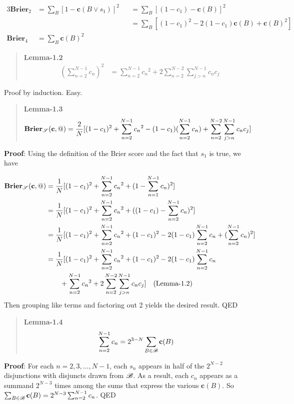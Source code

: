 \begin{alignat*}{3}
\mathbf{Brier}_2 &= \sum_B[1 - \mathbf{c}(B \vee s_1)]^2 &&= \sum_B[(1 - c_1) - \mathbf{c}(B)]^2 \\
& &&= \sum_B [(1-c_1)^2 - 2(1-c_1)\mathbf{c}(B) + \mathbf{c}(B)^2] \\
\mathbf{Brier}_4 &= \sum_B \mathbf{c}(B)^2 && \quad
\end{alignat*}

\begin{quote}
\textbf{Lemma-1.2} 
\begin{align*}
(\sum_{n=2}^{N-1} c_n)^2 &= \sum_{n=2}^{N-1} c{_n}^2 + 2 \sum_{n=2}^{N-2} \sum_{j>n}^{N-1}c_nc_j
\end{align*}
\end{quote}
Proof by induction. Easy. 

\begin{quote}
\textbf{Lemma-1.3}
\begin{align*}
\mathbf{Brier}_{\mathscr{S}}(\mathbf{c},@) &= \frac{2}{N}[(1-c_1)^2 + \sum_{n=2}^{N-1} c{_n}^2  - (1-c_1)(\sum_{n=2}^{N-1}c_n) + \sum_{n=2}^{N-2} \sum_{j>n}^{N-1}c_nc_j]
\end{align*}
\end{quote}
\textbf{Proof}: Using the definition of the Brier score and the fact that $s_1$ is true, we have
 
\begin{align*}
\mathbf{Brier}_{\mathscr{S}}(\mathbf{c},@) &= \frac{1}{N}[(1 - c_1)^2 + \sum_{n=2}^{N-1} c{_n}^2 + (1 - \sum_{n=1}^{N-1}c_n)^2] \\
&= \frac{1}{N}[(1 - c_1)^2 + \sum_{n=2}^{N-1} c{_n}^2 + ((1 -c_1) - \sum_{n=2}^{N-1}c_n)^2] \\
&= \frac{1}{N}[(1 - c_1)^2 + \sum_{n=2}^{N-1} c{_n}^2 + (1 -c_1)^2 - 2(1 - c_1) \sum_{n=2}^{N-1}c_n + (\sum_{n=2}^{N-1}c_n)^2] \\
&= \frac{1}{N}[(1 - c_1)^2 + \sum_{n=2}^{N-1} c{_n}^2 + (1 -c_1)^2 - 2(1 - c_1) \sum_{n=2}^{N-1}c_n  \\
&\quad \quad +\sum_{n=2}^{N-1} c{_n}^2 + 2 \sum_{n=2}^{N-2} \sum_{j>n}^{N-1}c_nc_j] \quad \text{(Lemma-1.2)}
\end{align*}
Then grouping like terms and factoring out 2 yields the desired result. QED

\begin{quote}
\textbf{Lemma-1.4}
\begin{align*}
\sum_{n=2}^{N-1}c_n &= 2^{3-N}\sum_{B \in \mathscr{B}}\mathbf{c}(B)
\end{align*}
\end{quote}
\textbf{Proof}: For each $n = 2, 3, \dots, N-1$, each $s_n$ appears in half of the $2^{N-2}$ disjunctions with disjuncts drawn from $\mathscr{B}$. As a result, each $c_n$ appears as a summand $2^{N-3}$ times among the sums that express the various $\mathbf{c}(B)$. So $\sum_{B \in \mathscr{B}}\mathbf{c}(B) = 2^{N-3}\sum_{n=2}^{N-1}c_n$. QED

